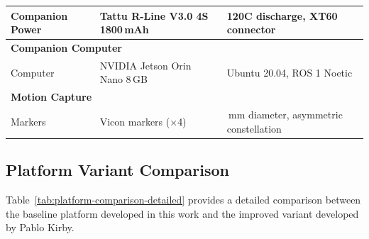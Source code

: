 \begin{table}[h]
\begin{tabularx}{\textwidth}{ll>{\raggedright\arraybackslash}X}
Companion Power & Tattu R-Line V3.0 4S 1800\,mAh & 120C discharge, XT60 connector \\
\midrule
\multicolumn{3}{l}{\textbf{Companion Computer}} \\
Computer & NVIDIA Jetson Orin Nano 8\,GB & Ubuntu 20.04, ROS 1 Noetic \\
\midrule
\multicolumn{3}{l}{\textbf{Motion Capture}} \\
Markers & Vicon markers ($\times$4) & 14\,mm diameter, asymmetric constellation \\
\bottomrule
\end{tabularx}
\end{table}

\subsection{Platform Variant Comparison}\label{sec:platform-comparison-detailed}

Table~\ref{tab:platform-comparison-detailed} provides a detailed comparison between the baseline platform developed in this work and the improved variant developed by Pablo Kirby.

